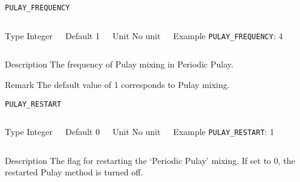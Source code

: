 \begin{frame}[allowframebreaks]{\texttt{PULAY\_FREQUENCY}} \label{PULAY_FREQUENCY}
\vspace*{-12pt}
\begin{columns}
\begin{block}{Type}
Integer
\end{block}

\begin{block}{Default}
1
\end{block}

\begin{block}{Unit}
No unit
\end{block}

\begin{block}{Example}
\texttt{PULAY\_FREQUENCY}: 4
\end{block}
\end{columns}

\begin{block}{Description}
The frequency of Pulay mixing in Periodic Pulay. 
\end{block}

\begin{block}{Remark}
The default value of 1 corresponds to Pulay mixing.
\end{block}

\end{frame}




\begin{frame}[allowframebreaks]{\texttt{PULAY\_RESTART}} \label{PULAY_RESTART}
\vspace*{-12pt}
\begin{columns}
\begin{block}{Type}
Integer
\end{block}

\begin{block}{Default}
0
\end{block}

\begin{block}{Unit}
No unit
\end{block}

\begin{block}{Example}
\texttt{PULAY\_RESTART}: 1
\end{block}
\end{columns}

\begin{block}{Description}
The flag for restarting the `Periodic Pulay' mixing. If set to 0, the restarted Pulay method is turned off.
\end{block}

\end{frame}



